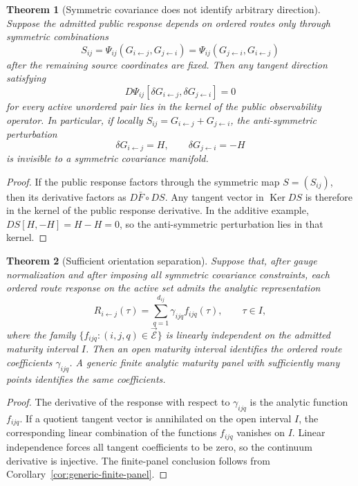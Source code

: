 \documentclass[11pt,a4paper]{amsart}
\theoremstyle{plain}
\newtheorem{theorem}{Theorem}[section]
\theoremstyle{definition}
\theoremstyle{remark}
\DeclareMathOperator{\Ker}{Ker}
\newcommand{\cE}{\mathcal{E}}
\begin{document}
\begin{theorem}[Symmetric covariance does not identify arbitrary direction]
\label{thm:symmetric-covariance-direction}
Suppose the admitted public response depends on ordered routes only through symmetric
combinations
\[
        S_{ij}
        =
        \Psi_{ij}(G_{i\leftarrow j},G_{j\leftarrow i})
        =
        \Psi_{ij}(G_{j\leftarrow i},G_{i\leftarrow j})
\]
after the remaining source coordinates are fixed.  Then any tangent direction satisfying
\[
        D\Psi_{ij}[\delta G_{i\leftarrow j},\delta G_{j\leftarrow i}]=0
\]
for every active unordered pair lies in the kernel of the public observability operator.  In
particular, if locally \(S_{ij}=G_{i\leftarrow j}+G_{j\leftarrow i}\), the anti-symmetric
perturbation
\[
        \delta G_{i\leftarrow j}=H,\qquad
        \delta G_{j\leftarrow i}=-H
\]
is invisible to a symmetric covariance manifold.
\end{theorem}

\begin{proof}
If the public response factors through the symmetric map \(S=(S_{ij})\), then its derivative
factors as \(D\bar F\circ DS\).  Any tangent vector in \(\Ker DS\) is therefore in the kernel of
the public response derivative.  In the additive example, \(DS[H,-H]=H-H=0\), so the anti-symmetric perturbation lies in that
kernel.
\end{proof}

\begin{theorem}[Sufficient orientation separation]\label{thm:orientation-separation}
Suppose that, after gauge normalization and after imposing all symmetric covariance
constraints, each ordered route response on the active set admits the analytic representation
\[
        R_{i\leftarrow j}(\tau)
        =
        \sum_{q=1}^{d_{ij}}\gamma_{ijq}f_{ijq}(\tau),
        \qquad \tau\in I,
\]
where the family \(\{f_{ijq}:(i,j,q)\in\vec{\cE}\}\) is linearly independent on the admitted
maturity interval \(I\).  Then an open maturity interval identifies the ordered route
coefficients \(\gamma_{ijq}\).  A generic finite analytic maturity panel with sufficiently many
points identifies the same coefficients.
\end{theorem}

\begin{proof}
The derivative of the response with respect to \(\gamma_{ijq}\) is the analytic function
\(f_{ijq}\).  If a quotient tangent vector is annihilated on the open interval \(I\), the
corresponding linear combination of the functions \(f_{ijq}\) vanishes on \(I\).  Linear
independence forces all tangent coefficients to be zero, so the continuum derivative is injective.
The finite-panel conclusion follows from Corollary~\ref{cor:generic-finite-panel}.
\end{proof}
\end{document}
